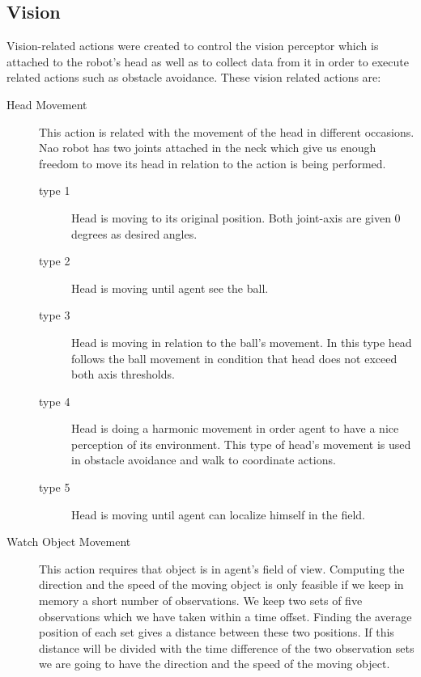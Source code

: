 \subsection{Vision}
Vision-related actions were created to control the vision perceptor which is attached to the robot's head as well as to collect data from it in order to execute related actions such as obstacle avoidance. These vision related actions are:
\begin{description}
 \item[Head Movement] This action is related with the movement of the head in different occasions. Nao robot has two joints attached in the neck which give us enough freedom to move its head in relation to the action is being performed.
 \begin{description}
 
 \item[type 1] Head is moving to its original position. Both joint-axis are given $0$ degrees as desired angles.
 
 \item[type 2] Head is moving until agent see the ball.
 
 \item[type 3] Head is moving in relation to the ball's movement. In this type head follows the ball movement in condition that head does not exceed both axis thresholds.
 
 \item[type 4] Head is doing a harmonic movement in order agent to have a nice perception of its environment. This type of head's movement is used in obstacle avoidance and walk to coordinate actions.
 
 \item[type 5] Head is moving until agent can localize himself in the field.
 
 \end{description}
 
 \item[Watch Object Movement] This action requires that object is in agent's field of view. Computing the direction and the speed of the moving object is only feasible if we keep in memory a short number of observations. We keep two sets of five observations which we have taken within a time offset. Finding the average position of each set gives a distance between these two positions. If this distance will be divided with the time difference of the two observation sets we are going to have the direction and the speed of the moving object.
 

\end{description}
